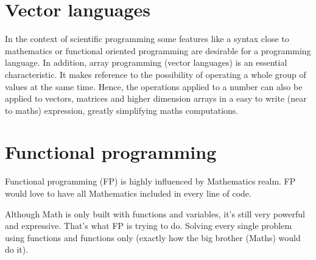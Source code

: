  

 
 
 
 
 
 
    \section{Vector languages}
 
 
In the context of scientific programming some features like a syntax close to mathematics or
functional oriented programming are desirable for a programming language. 
In addition, array programming (vector languages) is an essential characteristic. 
It makes reference to the possibility of operating a whole group of values at the same time.
Hence, the operations applied to a number can also be applied to vectors, matrices and higher dimension arrays
in a easy to write (near to maths) expression, greatly simplifying maths computations.
 
 
 
 
 
 
    \section{Functional programming} \label{sec:fpro}
 
Functional programming (FP) is highly influenced by Mathematics realm. 
FP would love to have all Mathematics included in every line of code.
 
Although Math is only built with functions and variables, it’s still very powerful and expressive. 
That’s what FP is trying to do. 
Solving every single problem using functions and functions only (exactly how the big brother (Maths) would do it).
 

